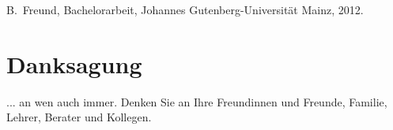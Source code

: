 \documentclass[a4paper,11pt,oneside,final,german,openbib,pdftex]{scrbook}
\begin{document}
\begin{appendix}
\begin{thebibliography}{99}
  B.~Freund, 
  Bachelorarbeit, Johannes Gutenberg-Universit\"at Mainz, 2012.

\end{thebibliography}

\chapter{Danksagung}

... an wen auch immer. Denken Sie an Ihre Freundinnen und Freunde, 
Familie, Lehrer, Berater und Kollegen.

\end{appendix}
\end{document}
